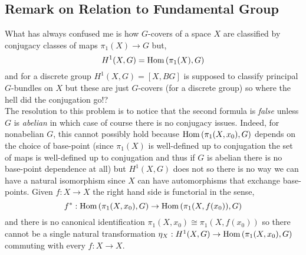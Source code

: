 \documentclass[12pt]{extarticle}
\begin{document}






\subsection{Remark on Relation to Fundamental Group}

What has always confused me is how $G$-covers of a space $X$ are classified by conjugacy classes of maps $\pi_1(X) \to G$ but,
\[ H^1(X, G) = \mathrm{Hom}\left( \pi_1(X), G \right) \] 
and for a discrete group $H^1(X, G) = [X, BG]$ is supposed to classify  principal $G$-bundles on $X$ but these are just $G$-covers (for a discrete group) so where the hell did the conjugation go!?
\bigskip\\
The resolution to this problem is to notice that the second formula is \textit{false} unless $G$ is \textit{abelian} in which case of course there is no conjugacy issues. Indeed, for nonabelian $G$, this cannot possibly hold because $\mathrm{Hom}\left( \pi_1(X, x_0), G \right)$ depends on the choice of base-point (since $\pi_1(X)$ is well-defined up to conjugation the set of maps is well-defined up to conjugation and thus if $G$ is abelian there is no base-point dependence at all) but $H^1(X, G)$ does not so there is no way we can have a natural isomorphism since $X$ can have automorphisms that exchange base-points. Given $f : X \to X$ the right hand side is functorial in the sense,
\[ f^* : \mathrm{Hom}\left( \pi_1(X, x_0), G \right) \to \mathrm{Hom}\left( \pi_1(X, f(x_0)), G \right) \]
and there is no canonical identification $\pi_1(X, x_0) \cong \pi_1(X, f(x_0))$ so there cannot be a single natural transformation $\eta_X : H^1(X, G) \to \mathrm{Hom}\left( \pi_1(X, x_0), G \right)$ commuting with every $f : X \to X$.
\end{document}
